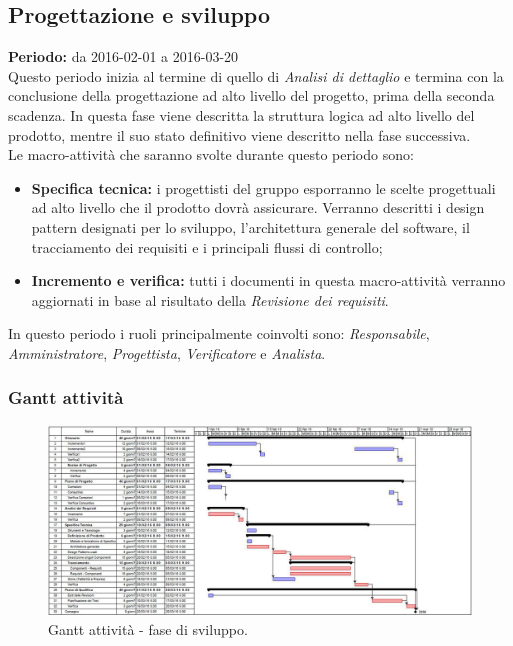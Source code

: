 \documentclass[a4paper]{article}
\begin{document}
		\subsection{Progettazione e sviluppo}
			\textbf{Periodo:} da 2016-02-01 a 2016-03-20 \\
			Questo periodo inizia al termine di quello di \emph{Analisi di dettaglio} e termina con la conclusione 
			della progettazione ad alto livello del progetto, prima della seconda scadenza. In questa fase viene 
			descritta la struttura logica ad alto livello del prodotto, mentre il suo stato definitivo viene 
			descritto nella fase successiva. \\
			Le macro-attività che saranno svolte durante questo periodo sono:
			\begin{itemize}
				\item \textbf{Specifica tecnica:} i progettisti del gruppo esporranno le scelte progettuali ad alto 
				livello che il prodotto dovrà assicurare. Verranno descritti i design pattern designati per lo sviluppo, 
				l'architettura generale del software, il tracciamento dei requisiti e i principali flussi di controllo;
				\item \textbf{Incremento e verifica:} tutti i documenti in questa macro-attività verranno aggiornati in base 
				al risultato della \emph{Revisione dei requisiti}.
			\end{itemize}
			In questo periodo i ruoli principalmente coinvolti sono: \emph{Responsabile}, \emph{Amministratore},
			\emph{Progettista}, \emph{Verificatore} e  \emph{Analista}.

			\subsubsection{Gantt attività}
				\begin{figure}[H]
					\centering
					\includegraphics[scale=0.4]{gantt_sviluppo}
					\caption{Gantt attività - fase di sviluppo.}
				\end{figure}
\end{document}
